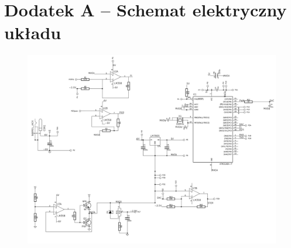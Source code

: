 \chapter{Dodatek A -- Schemat elektryczny układu}
\begin{figure}[H]
	\centering
	\includegraphics[angle=90,origin=c,width=16.5cm]{grafiki/schemat_elek2}
	\label{rys:shcemat_elektryczny}
\end{figure}